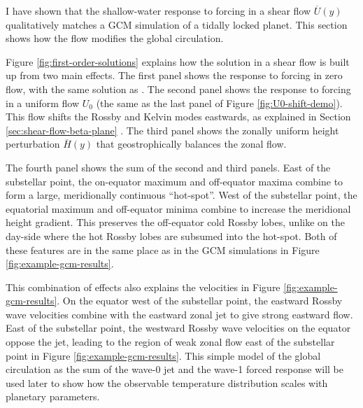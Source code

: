 I have shown that the shallow-water response to forcing in a shear flow $\overline{U}(y)$ qualitatively matches a GCM simulation of a tidally locked planet. This section shows how the flow modifies the global circulation.

Figure \ref{fig:first-order-solutions} explains how the solution in a shear flow is built up from two main effects. The first panel shows the response to forcing in zero flow, with the same solution as \citet{matsuno1966quasi}. The second panel shows the response to forcing in a uniform flow $U_{0}$ (the same as the last panel of Figure \ref{fig:U0-shift-demo}). This flow shifts the Rossby and Kelvin modes eastwards, as explained in Section \ref{sec:shear-flow-beta-plane} \citep{tsai2014three}. The third panel shows the zonally uniform height perturbation $\overline{H}(y)$ that geostrophically balances the zonal flow.

The fourth panel shows the sum of the second and third panels. East of the substellar point, the on-equator maximum and off-equator maxima combine to form a large, meridionally continuous ``hot-spot''. West of the substellar point, the equatorial maximum and off-equator minima combine to increase the meridional height gradient. This preserves the off-equator cold Rossby lobes, unlike on the day-side where the hot Rossby lobes are subsumed into the hot-spot. Both of these features are in the same place as in the GCM simulations in Figure \ref{fig:example-gcm-results}.

This combination of effects also explains the velocities in Figure \ref{fig:example-gcm-results}. On the equator west of the substellar point, the eastward Rossby wave velocities combine with the eastward zonal jet to give strong eastward flow. East of the substellar point, the westward Rossby wave velocities on the equator oppose the jet, leading to the region of weak zonal flow east of the substellar point in Figure \ref{fig:example-gcm-results}. This simple model of the global circulation as the sum of the wave-0 jet and the wave-1 forced response will be used later to show how the observable temperature distribution scales with planetary parameters.




%
%


